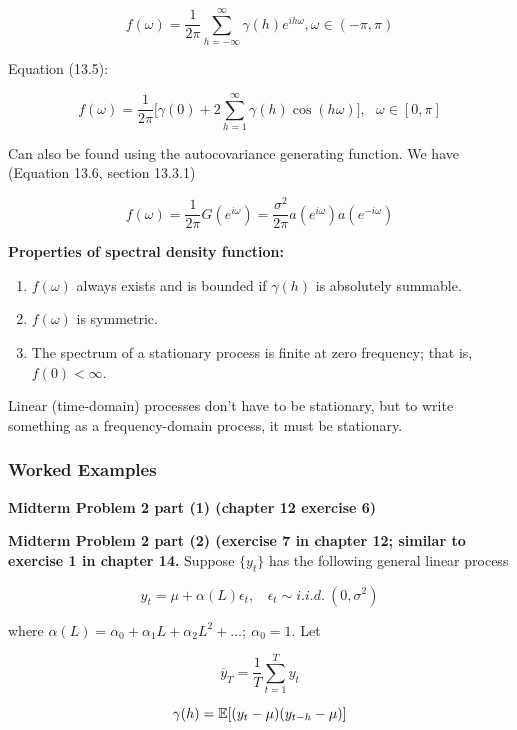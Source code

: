\[
f(\omega) = \frac{1}{2 \pi} \sum_{h = - \infty}^\infty \gamma(h) e^{i h \omega}, \omega \in (-\pi, \pi)
\]

Equation (13.5):

\[
f(\omega) = \frac{1}{2\pi} \bigg[ \gamma(0) + 2 \sum_{h=1}^\infty \gamma(h) \cos(h \omega) \bigg], \ \ \ \omega \in [0, \pi]
\]

Can also be found using the autocovariance generating function. We have (Equation 13.6, section 13.3.1)

\[
f(\omega) = \frac{1}{2\pi}G(e^{i \omega}) = \frac{\sigma^2}{2 \pi} a(e^{i \omega}) a(e^{- i \omega})
\]

\textbf{Properties of spectral density function:}

\begin{enumerate}[(1)]

\item \(f(\omega)\) always exists and is bounded if \(\gamma(h)\) is absolutely summable.

\item \(f(\omega)\) is symmetric.

\item The spectrum of a stationary process is finite at zero frequency; that is, \(f(0) < \infty\).

\end{enumerate}

Linear (time-domain) processes don't have to be stationary, but to write something as a frequency-domain process, it must be stationary.

\subsubsection{Worked Examples}\label{ts.ch13.examples}


\textbf{Midterm Problem 2 part (1) (chapter 12 exercise 6)}

\textbf{Midterm Problem 2 part (2) (exercise 7 in chapter 12; similar to exercise 1 in chapter 14.} Suppose \(\{y_t\}\) has the following general linear process

\[
y_t = \mu + \alpha(L)\epsilon_t, \ \ \ \ \epsilon_t \sim i.i.d. \ (0, \sigma^2)
\]

where \(\alpha(L) = \alpha_0 + \alpha_1 L + \alpha_2 L^2 + \ldots; \ \alpha_0 = 1\). Let 

\[
\overline{y}_T = \frac{1}{T} \sum_{t=1}^T y_t
\]

\[
\gamma(h) = \E[(y_t - \mu)(y_{t-h} - \mu)]
\]

